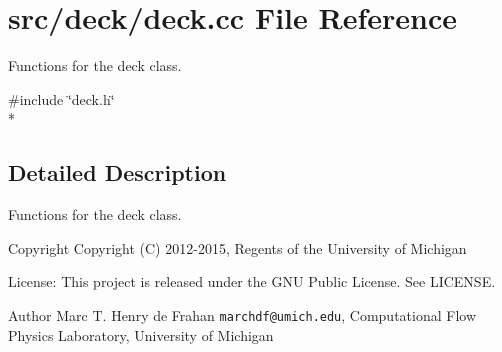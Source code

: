 \section{src/deck/deck.cc File Reference}
\label{deck_8cc}


Functions for the deck class.  


{\ttfamily \#include \char`\"{}deck.\-h\char`\"{}}\\*


\subsection{Detailed Description}
Functions for the deck class. \begin{DoxyCopyright}{Copyright}
Copyright (C) 2012-\/2015, Regents of the University of Michigan 
\end{DoxyCopyright}
\begin{DoxyParagraph}{License\-:}
This project is released under the G\-N\-U Public License. See L\-I\-C\-E\-N\-S\-E. 
\end{DoxyParagraph}
\begin{DoxyAuthor}{Author}
Marc T. Henry de Frahan {\tt marchdf@umich.\-edu}, Computational Flow Physics Laboratory, University of Michigan 
\end{DoxyAuthor}
